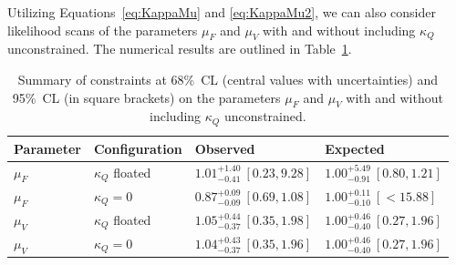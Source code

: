 
Utilizing Equations~\ref{eq:KappaMu} and \ref{eq:KappaMu2}, we can also consider likelihood scans of the parameters $\mu_F$ and $\mu_V$ 
with and without including $\kappa_Q$ unconstrained. The numerical results are outlined in Table~\ref{table:offshellKappa}.\\

\begin{table}[!hbt]
\centering
\begin{tabular}{llll}
Parameter       &     Configuration     & {Observed}          &  {Expected}   \\
\hline
$\mu_F$     & $\kappa_Q$ floated & $1.01^{+1.40}_{-0.41} ~[0.23,9.28]$   &  $1.00^{+5.49}_{-0.91} ~[0.80,1.21]$ \\
$\mu_F$     & $\kappa_Q=0$       & $0.87^{+0.09}_{-0.09} ~[0.69,1.08]$   &  $1.00^{+0.11}_{-0.10} ~[ < 15.88]$  \\
$\mu_V$     & $\kappa_Q$ floated & $1.05^{+0.44}_{-0.37} ~[0.35,1.98]$   &  $1.00^{+0.46}_{-0.40} ~[0.27,1.96]$  \\
$\mu_V$     & $\kappa_Q=0$       & $1.04^{+0.43}_{-0.37} ~[0.35,1.96]$   &  $1.00^{+0.46}_{-0.40} ~[0.27,1.96]$  \\
\end{tabular}
\caption{
Summary of constraints at 68\%~CL (central values with uncertainties) and 95\%~CL (in square brackets) on the parameters $\mu_F$ and $\mu_V$ with and without including $\kappa_Q$ unconstrained.}
\label{table:offshellKappa}
\end{table}


